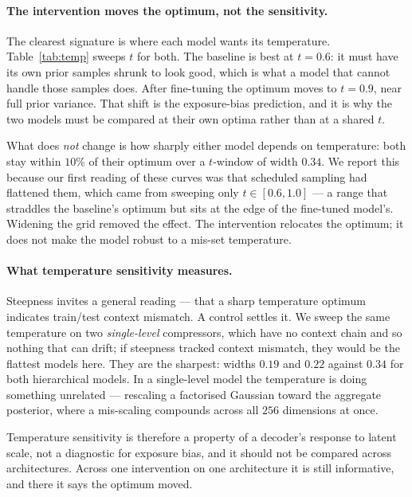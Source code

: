 \documentclass[sigconf,nonacm]{acmart}
\begin{document}
\paragraph{The intervention moves the optimum, not the sensitivity.}
The clearest signature is where each model wants its temperature.
Table~\ref{tab:temp} sweeps $t$ for both. The baseline is best at $t{=}0.6$:
it must have its own prior samples shrunk to look good, which is what a model
that cannot handle those samples does. After fine-tuning the optimum moves to
$t{=}0.9$, near full prior variance. That shift is the exposure-bias
prediction, and it is why the two models must be compared at their own optima
rather than at a shared $t$.

What does \emph{not} change is how sharply either model depends on temperature:
both stay within $10\%$ of their optimum over a $t$-window of width $0.34$. We
report this because our first reading of these curves was that scheduled
sampling had flattened them, which came from sweeping only $t \in [0.6, 1.0]$ ---
a range that straddles the baseline's optimum but sits at the edge of the
fine-tuned model's. Widening the grid removed the effect. The intervention
relocates the optimum; it does not make the model robust to a mis-set
temperature.

\paragraph{What temperature sensitivity measures.}
Steepness invites a general reading --- that a sharp temperature optimum
indicates train/test context mismatch. A control settles it. We sweep the same
temperature on two \emph{single-level} compressors, which have no context chain
and so nothing that can drift; if steepness tracked context mismatch, they would
be the flattest models here. They are the sharpest: widths $0.19$ and $0.22$
against $0.34$ for both hierarchical models. In a single-level model the
temperature is doing something unrelated --- rescaling a factorised Gaussian
toward the aggregate posterior, where a mis-scaling compounds across all $256$
dimensions at once.

Temperature sensitivity is therefore a property of a decoder's response to
latent scale, not a diagnostic for exposure bias, and it should not be compared
across architectures. Across one intervention on one architecture it is still
informative, and there it says the optimum moved.
\end{document}
